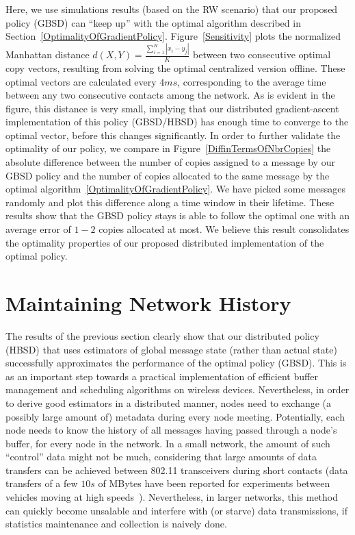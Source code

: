 Here, we use simulations results (based on the RW scenario) that our proposed policy (GBSD) can ``keep up'' with the optimal algorithm described in Section~\ref{OptimalityOfGradientPolicy}. Figure~\ref{Sensitivity} plots the normalized Manhattan distance $d(X,Y) = \frac{\sum_{i=1}^{K}|x_i - y_j|}{K}$ between two consecutive optimal copy vectors, resulting from solving the optimal centralized version offline. These optimal vectors are calculated every $4ms$, corresponding to the average time between any two consecutive contacts among the network. As is evident in the figure, this distance is very small, implying that our distributed gradient-ascent implementation of this policy (GBSD/HBSD) has enough time to converge to the optimal vector, before this changes significantly. In order to further validate the optimality of our policy, we compare in Figure~\ref{DiffinTermsOfNbrCopies} the absolute difference between the number of copies assigned to a message by our GBSD policy and the number of copies allocated to the same message by the optimal algorithm~\ref{OptimalityOfGradientPolicy}. We have picked some messages randomly and plot this difference along a time window in their lifetime. These results show that the GBSD policy stays is able to follow the optimal one with an average error of $1-2$ copies allocated at most. We believe this result consolidates the optimality properties of our proposed distributed implementation of the optimal policy.

\section{Maintaining Network History}
\label{sec:NetworkHistory}

The results of the previous section clearly show that our distributed policy (HBSD) that uses estimators of global message state (rather than actual state) successfully approximates the performance of the optimal policy (GBSD). This is as an important step towards a practical implementation of efficient buffer management and scheduling algorithms on wireless devices. Nevertheless, in order to derive good estimators in a distributed manner, nodes need to exchange (a possibly large amount of) metadata during every node meeting. Potentially, each node needs to know the history of all messages having passed through a node's buffer, for every node in the network. In a small network, the amount of such ``control'' data might not be much, considering that large amounts of data transfers can be achieved between 802.11 transceivers during short contacts (data transfers of a few $10s$ of MBytes have been reported for experiments between vehicles moving at high speeds~\cite{Keshav:Mobisys07}). Nevertheless, in larger networks, this method can quickly become unsalable and interfere with (or starve) data transmissions, if statistics maintenance and collection is naively done.

